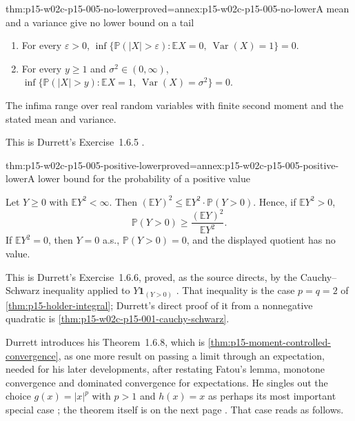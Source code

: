 \begin{hbtheorem}{thm:p15-w02c-p15-005-no-lower}{proved=annex:p15-w02c-p15-005-no-lower}{A mean and a variance give no lower bound on a tail}
\par\nobreak
\begin{enumerate}
\item For every \(\varepsilon>0\),
      \(\inf\{\mathbb P(|X|>\varepsilon):\mathbb EX=0,\
      \operatorname{Var}(X)=1\}=0\).
\item For every \(y\geq1\) and \(\sigma^2\in(0,\infty)\),
      \(\inf\{\mathbb P(|X|>y):\mathbb EX=1,\
      \operatorname{Var}(X)=\sigma^2\}=0\).
\end{enumerate}
The infima range over real random variables with finite second moment
and the stated mean and variance.
\end{hbtheorem}

This is Durrett's Exercise~1.6.5 \cite[p.~36]{DurrettPTEAuthor2019}.

\begin{hbtheorem}{thm:p15-w02c-p15-005-positive-lower}{proved=annex:p15-w02c-p15-005-positive-lower}{A lower bound for the probability of a positive value}
\par\nobreak
Let \(Y\geq0\) with \(\mathbb EY^2<\infty\). Then
\((\mathbb EY)^2\leq\mathbb EY^2\cdot\mathbb P(Y>0)\). Hence, if
\(\mathbb EY^2>0\),
\[
 \mathbb P(Y>0)\geq\frac{(\mathbb EY)^2}{\mathbb EY^2} .
\]
If \(\mathbb EY^2=0\), then \(Y=0\) a.s., \(\mathbb P(Y>0)=0\), and
the displayed quotient has no value.
\end{hbtheorem}

This is Durrett's Exercise~1.6.6, proved, as the source directs, by
the Cauchy--Schwarz inequality applied to \(Y\mathbf1_{(Y>0)}\)
\cite[p.~36]{DurrettPTEAuthor2019}. That inequality is the case
\(p=q=2\) of \cref{thm:p15-holder-integral}; Durrett's direct proof of
it from a nonnegative quadratic is
\cref{thm:p15-w02c-p15-001-cauchy-schwarz}.

Durrett introduces his Theorem~1.6.8, which is
\cref{thm:p15-moment-controlled-convergence}, as one more result on
passing a limit through an expectation, needed for his later
developments, after restating Fatou's lemma, monotone convergence and
dominated convergence for expectations. He singles out the choice
\(g(x)=|x|^p\) with \(p>1\) and \(h(x)=x\) as perhaps its most
important special case \cite[p.~30]{DurrettPTEAuthor2019}; the theorem
itself is on the next page \cite[thm.~1.6.8, p.~31]{DurrettPTEAuthor2019}.
That case reads as follows.

